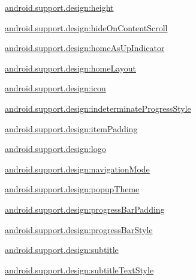 {\ttfamily \hyperlink{classandroid_1_1support_1_1design_1_1R_1_1styleable_a7e935cdf4fb18cfcd8e0e46a55688835}{android.\+support.\+design\+:height}}

{\ttfamily \hyperlink{classandroid_1_1support_1_1design_1_1R_1_1styleable_aaacf39cc520445677c982038b3f1c151}{android.\+support.\+design\+:hide\+On\+Content\+Scroll}}

{\ttfamily \hyperlink{classandroid_1_1support_1_1design_1_1R_1_1styleable_a99993170cd30fcfabe0a4cf22e1ab405}{android.\+support.\+design\+:home\+As\+Up\+Indicator}}

{\ttfamily \hyperlink{classandroid_1_1support_1_1design_1_1R_1_1styleable_a68a6be872a400b3a54e7392b5af0942c}{android.\+support.\+design\+:home\+Layout}}

{\ttfamily \hyperlink{classandroid_1_1support_1_1design_1_1R_1_1styleable_a356bb80ee476da75d83e098c4ba916e0}{android.\+support.\+design\+:icon}}

{\ttfamily \hyperlink{classandroid_1_1support_1_1design_1_1R_1_1styleable_aaaf61ddc78cf22a50998e89590c52198}{android.\+support.\+design\+:indeterminate\+Progress\+Style}}

{\ttfamily \hyperlink{classandroid_1_1support_1_1design_1_1R_1_1styleable_a78fa3cd1aaa0862234ec9dbe574b9ec8}{android.\+support.\+design\+:item\+Padding}}

{\ttfamily \hyperlink{classandroid_1_1support_1_1design_1_1R_1_1styleable_a2e3a0d864b97ab7733b49ad177a6e546}{android.\+support.\+design\+:logo}}

{\ttfamily \hyperlink{classandroid_1_1support_1_1design_1_1R_1_1styleable_a3b1d975d496c69cd5c70aa11b32bfacb}{android.\+support.\+design\+:navigation\+Mode}}

{\ttfamily \hyperlink{classandroid_1_1support_1_1design_1_1R_1_1styleable_ad9bc331aad9e2db0b8aae27b3c65b27a}{android.\+support.\+design\+:popup\+Theme}}

{\ttfamily \hyperlink{classandroid_1_1support_1_1design_1_1R_1_1styleable_a6016ed7a959c61f6ddc620a7a7b8c41f}{android.\+support.\+design\+:progress\+Bar\+Padding}}

{\ttfamily \hyperlink{classandroid_1_1support_1_1design_1_1R_1_1styleable_a3e9e3b6cbfbc94e8c2cf7b0dc31e1a87}{android.\+support.\+design\+:progress\+Bar\+Style}}

{\ttfamily \hyperlink{classandroid_1_1support_1_1design_1_1R_1_1styleable_a26cd68edf0c066a7b5fb1dbe28a37b3c}{android.\+support.\+design\+:subtitle}}

{\ttfamily \hyperlink{classandroid_1_1support_1_1design_1_1R_1_1styleable_a0773b4b5cb408a7cf70b187a6507fd8c}{android.\+support.\+design\+:subtitle\+Text\+Style}}

